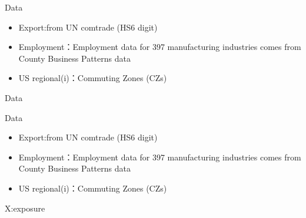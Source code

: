 \documentclass[10pt,aspectratio=43,mathserif,table]{beamer}
\begin{document}
\begin{frame}{Data}
	\begin{itemize}
		\item<0->  Export:from UN comtrade (HS6 digit)
		\item<0->  Employment：Employment data for 397 manufacturing industries comes from County Business Patterns data
		\item<0->  US regional(i)：Commuting Zones (CZs) 
	\end{itemize}

\end{frame}
\begin{frame}{Data}
		\centering
{}
\end{frame}

\begin{frame}{Data}
	\begin{itemize}
		\item<0->  Export:from UN comtrade (HS6 digit)
		\item<0->  Employment：Employment data for 397 manufacturing industries comes from County Business Patterns data
		\item<0->  US regional(i)：Commuting Zones (CZs) 
	\end{itemize}
	
\end{frame}


\begin{frame}{X:exposure}
	\centering
\end{frame}
\end{document}
